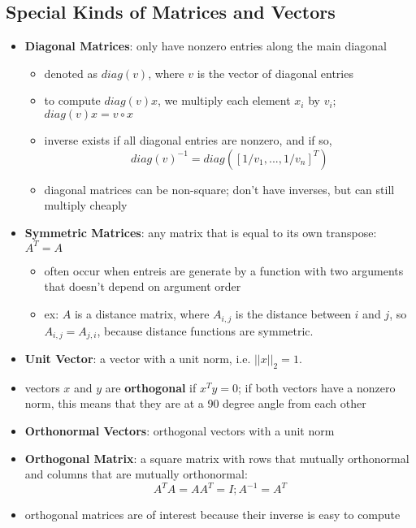 \subsection{Special Kinds of Matrices and Vectors}
\begin{itemize}
    \item \textbf{Diagonal Matrices}: only have nonzero entries along the main diagonal
    \begin{itemize}
        \item denoted as $diag(v)$, where $v$ is the vector of diagonal entries
        \item to compute $diag(v)x$, we multiply each element $x_i$ by $v_i$; $diag(v)x = v \circ x$
        \item inverse exists if all diagonal entries are nonzero, and if so,
        $$ diag(v)^{-1} = diag([1/v_1, ..., 1/v_n]^T) $$
        \item diagonal matrices can be non-square; don't have inverses, but can still multiply cheaply
    \end{itemize}
    \item \textbf{Symmetric Matrices}: any matrix that is equal to its own transpose: $A^T = A$
    \begin{itemize}
        \item often occur when entreis are generate by a function with two arguments that doesn't depend on argument order
        \item ex: $A$ is a distance matrix, where $A_{i,j}$ is the distance between $i$ and $j$, so $A_{i,j} = A_{j,i}$, because distance functions are symmetric.
    \end{itemize}
    \item \textbf{Unit Vector}: a vector with a unit norm, i.e. $||x||_2 = 1$.
    \item vectors $x$ and $y$ are \textbf{orthogonal} if $x^T y = 0$; if both vectors have a nonzero norm, this means that they are at a 90 degree angle from each other 
    \item \textbf{Orthonormal Vectors}: orthogonal vectors with a unit norm
    \item \textbf{Orthogonal Matrix}: a square matrix with rows that mutually orthonormal and columns that are mutually orthonormal:
    $$ A^T A = AA^T = I; A^{-1} = A^T $$
    \item orthogonal matrices are of interest because their inverse is easy to compute
\end{itemize}

